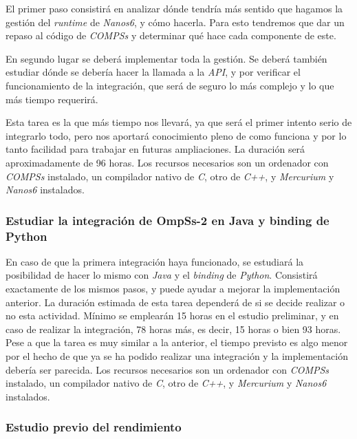 El primer paso consistirá en analizar dónde tendría más sentido que hagamos la gestión del \textit{runtime} de \textit{Nanos6}, y cómo hacerla. Para esto tendremos que dar un repaso al código de \textit{COMPSs} y determinar qué hace cada componente de este. 

En segundo lugar se deberá implementar toda la gestión. Se deberá también estudiar dónde se debería hacer la llamada a la \textit{API}, y por verificar el funcionamiento de la integración, que será de seguro lo más complejo y lo que más tiempo requerirá.

Esta tarea es la que más tiempo nos llevará, ya que será el primer intento serio de integrarlo todo, pero nos aportará conocimiento pleno de como funciona y por lo tanto facilidad para trabajar en futuras ampliaciones. La duración será aproximadamente de 96 horas. Los recursos necesarios son un ordenador con \textit{COMPSs} instalado, un compilador nativo de \textit{C}, otro de \textit{C++}, y \textit{Mercurium} y \textit{Nanos6} instalados.

\subsubsection{Estudiar la integración de OmpSs-2 en Java y binding de Python}

En caso de que la primera integración haya funcionado, se estudiará la posibilidad de hacer lo mismo con \textit{Java} y el \textit{binding} de \textit{Python}. Consistirá exactamente de los mismos pasos, y puede ayudar a mejorar la implementación anterior. La duración estimada de esta tarea dependerá de si se decide realizar o no esta actividad. Mínimo se emplearán 15 horas en el estudio preliminar, y en caso de realizar la integración, 78 horas más, es decir, 15 horas o bien 93 horas. Pese a que la tarea es muy similar a la anterior, el tiempo previsto es algo menor por el hecho de que ya se ha podido realizar una integración y la implementación debería ser parecida. Los recursos necesarios son un ordenador con \textit{COMPSs} instalado, un compilador nativo de \textit{C}, otro de \textit{C++}, y \textit{Mercurium} y \textit{Nanos6} instalados.

\subsubsection{Estudio previo del rendimiento}

